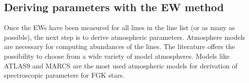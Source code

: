 \documentclass{aa}
\begin{document}



\subsection{Deriving parameters with the EW method}
\label{sec:deriving_parameters_with_the_ew_method}

Once the EWs have been measured for all lines in the line list (or as
many as possible), the next step is to derive atmospheric parameters.
Atmosphere models are necessary for computing abundances of the lines.
The literature offers the possibility to choose from a wide variety
of model atmospheres. Models like ATLAS9 \citep{Kurucz1993} and
MARCS \citep{Gustafson2008} are the most used atmospheric models for
derivation of spectroscopic parameters for FGK stars.
\end{document}
